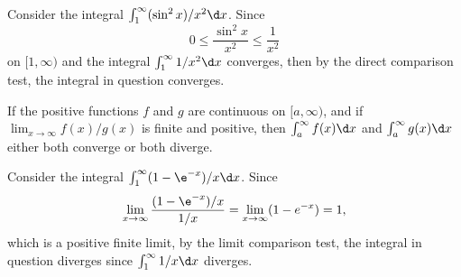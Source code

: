 \begin{example}
    Consider the integral $\int_1^\infty (\sin^2 x)/x^2 \d x$. Since \[0 \leq \frac{\sin^2 x}{x^2} \leq \frac1{x^2}\] on $[1, \infty)$ and the integral $\int_1^\infty 1/x^2 \d x$ converges, then by the direct comparison test, the integral in question converges.
\end{example}

\begin{proposition}
    If the positive functions $f$ and $g$ are continuous on $[a, \infty)$, and if $\lim_{x \to \infty} f(x)/g(x)$ is finite and positive, then $\int_a^\infty f(x) \d x$ and $\int_a^\infty g(x) \d x$ either both converge or both diverge.
\end{proposition}

\begin{example}
    Consider the integral $\int_1^\infty (1-\e^{-x})/x \d x$. Since \[\lim_{x \to \infty} \frac{(1-\e^{-x})/x}{1/x} = \lim_{x \to \infty} (1 - e^{-x}) = 1,\] which is a positive finite limit, by the limit comparison test, the integral in question diverges since $\int_1^\infty 1/x \d x$ diverges.
\end{example}
